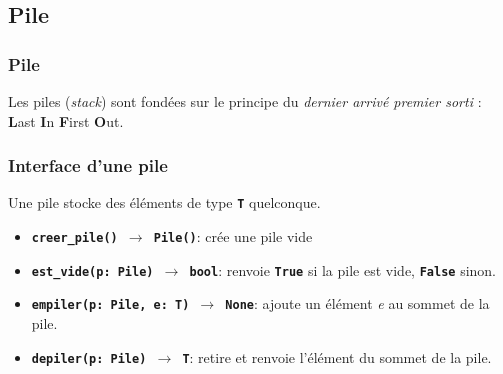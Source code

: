 \documentclass[svgnames,11pt]{beamer}
\begin{document}
\subsection{Pile}
\begin{frame}
    \frametitle{Pile}
    \begin{aretenir}[]
        Les piles (\emph{stack}) sont fondées sur le principe du \emph{dernier arrivé premier sorti} : \textbf{L}ast \textbf{I}n \textbf{F}irst \textbf{O}ut.
    \end{aretenir}


\end{frame}
\begin{frame}
    \frametitle{}

    \begin{center}
    \end{center}
\end{frame}
\begin{frame}
    \frametitle{}

    \begin{center}
    

    \end{center}
\end{frame}
\begin{frame}
    \frametitle{Interface d'une pile}
    Une pile stocke des éléments de type \textbf{\texttt{T}} quelconque.
    \begin{itemize}
        \item \texttt{\textbf{creer\_pile() $\rightarrow$ Pile()}}: crée une pile vide
        \item \texttt{\textbf{est\_vide(p: Pile) $\rightarrow$ bool}}: renvoie \textbf{\texttt{True}} si la pile est vide, \textbf{\texttt{False}} sinon.
        \item \texttt{\textbf{empiler(p: Pile, e: T) $\rightarrow$ None}}: ajoute un élément \emph{e} au sommet de la pile.
        \item \texttt{\textbf{depiler(p: Pile) $\rightarrow$ T}}: retire et renvoie l'élément du sommet de la pile.
    \end{itemize}

\end{frame}
\end{document}
